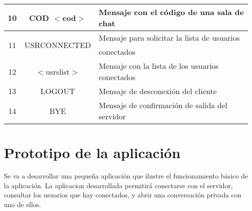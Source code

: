 \documentclass[12pt]{article}       %
\begin{document}
\begin{center}
\begin{tabular}{|c|c|l|}
10 & COD $<$cod$>$ & Mensaje con el código de una sala de chat\\
\hline
\multirow{2}{*}{11} & \multirow{2}{*}{USRCONNECTED} & Mensaje para solicitar la lista de usuarios\\
					& 								& conectados\\
\hline
12 & $<$usrslist$>$ & Mensaje con la lista de los usuarios conectados\\
\hline
13 & LOGOUT & Mensaje de desconexión del cliente\\
\hline
14 & BYE & Mensaje de confirmación de salida del servidor \\
\hline
\end{tabular}
\end{center}

\section{Prototipo de la aplicación}

Se va a desarrollar una pequeña aplicación que ilustre el funcionamiento básico de la aplicación. La aplicacion desarrollada permitirá conectarse con el servidor, consultar los usuarios que hay conectados, y abrir una conversación privada con uno de ellos.
\end{document}
